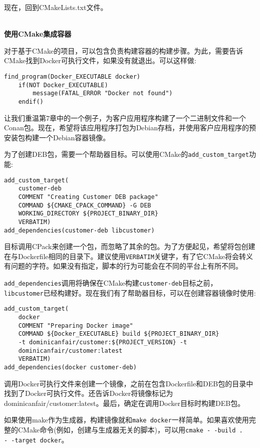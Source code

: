 现在，回到CMakeLists.txt文件。

\hspace*{\fill} \\ %
\noindent
\textbf{使用CMake集成容器}

对于基于CMake的项目，可以包含负责构建容器的构建步骤。为此，需要告诉CMake找到Docker可执行文件，如果没有就退出。可以这样做:

\begin{lstlisting}[style=styleCMake]
find_program(Docker_EXECUTABLE docker)
	if(NOT Docker_EXECUTABLE)
		message(FATAL_ERROR "Docker not found")
	endif()
\end{lstlisting}

让我们重温第7章中的一个例子，为客户应用程序构建了一个二进制文件和一个Conan包。现在，希望将该应用程序打包为Debian存档，并使用客户应用程序的预安装包构建一个Debian容器镜像。

为了创建DEB包，需要一个帮助器目标。可以使用CMake的\texttt{add\_custom\_target}功能:

\begin{lstlisting}[style=styleCMake]
add_custom_target(
	customer-deb
	COMMENT "Creating Customer DEB package"
	COMMAND ${CMAKE_CPACK_COMMAND} -G DEB
	WORKING_DIRECTORY ${PROJECT_BINARY_DIR}
	VERBATIM)
add_dependencies(customer-deb libcustomer)
\end{lstlisting}

目标调用CPack来创建一个包，而忽略了其余的包。为了方便起见，希望将包创建在与Dockerfile相同的目录下。建议使用\texttt{VERBATIM}关键字，有了它CMake将会转义有问题的字符。如果没有指定，脚本的行为可能会在不同的平台上有所不同。

\texttt{add\_dependencies}调用将确保在CMake构建\texttt{customer-deb}目标之前，\texttt{libcustomer}已经构建好。现在我们有了帮助器目标，可以在创建容器镜像时使用:

\begin{lstlisting}[style=styleCMake]
add_custom_target(
	docker
	COMMENT "Preparing Docker image"
	COMMAND ${Docker_EXECUTABLE} build ${PROJECT_BINARY_DIR}
	-t dominicanfair/customer:${PROJECT_VERSION} -t
	dominicanfair/customer:latest
	VERBATIM)
add_dependencies(docker customer-deb)
\end{lstlisting}

调用Docker可执行文件来创建一个镜像，之前在包含Dockerfile和DEB包的目录中找到了Docker可执行文件。还告诉Docker将镜像标记为dominicanfair/customer:latest。最后，确定在调用Docker目标时构建DEB包。

如果使用make作为生成器，构建镜像就和\texttt{make docker}一样简单。如果喜欢使用完整的CMake命令(例如，创建与生成器无关的脚本)，可以用\texttt{cmake -\,-build . -\,-target docker}。













